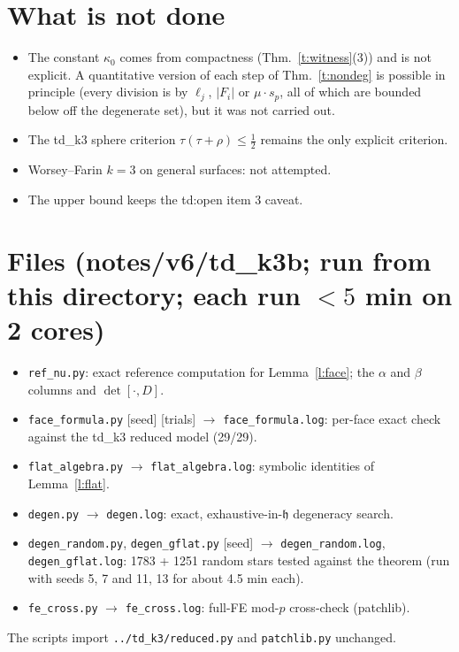 \documentclass[11pt]{article}
\theoremstyle{definition}
\newcommand{\hh}{\mathfrak h}
\begin{document}
\section{What is not done}
\begin{itemize}[leftmargin=1.2em]
\item The constant $\kappa_0$ comes from compactness (Thm.~\ref{t:witness}(3)) and is not explicit. A quantitative version of each step of Thm.~\ref{t:nondeg} is possible in principle (every division is by $\ell_j$, $|F_i|$ or $\mu\cdot s_p$, all of which are bounded below off the degenerate set), but it was not carried out.
\item The td\_k3 sphere criterion $\tau(\tau+\rho)\le\frac12$ remains the only explicit criterion.
\item Worsey--Farin $k=3$ on general surfaces: not attempted.
\item The upper bound keeps the td:open item 3 caveat.
\end{itemize}

\section*{Files (notes/v6/td\_k3b; run from this directory; each run $<5$ min on 2 cores)}
\begin{itemize}[leftmargin=1.2em]\small
\item \texttt{ref\_nu.py}: exact reference computation for Lemma~\ref{l:face}; the $\alpha$ and $\beta$ columns and $\det[\cdot,D]$.
\item \texttt{face\_formula.py} [seed] [trials] $\to$ \texttt{face\_formula.log}: per-face exact check against the td\_k3 reduced model (29/29).
\item \texttt{flat\_algebra.py} $\to$ \texttt{flat\_algebra.log}: symbolic identities of Lemma~\ref{l:flat}.
\item \texttt{degen.py} $\to$ \texttt{degen.log}: exact, exhaustive-in-$\hh$ degeneracy search.
\item \texttt{degen\_random.py}, \texttt{degen\_gflat.py} [seed] $\to$ \texttt{degen\_random.log}, \texttt{degen\_gflat.log}: 1783 + 1251 random stars tested against the theorem (run with seeds 5, 7 and 11, 13 for about 4.5 min each).
\item \texttt{fe\_cross.py} $\to$ \texttt{fe\_cross.log}: full-FE mod-$p$ cross-check (patchlib).
\end{itemize}
The scripts import \texttt{../td\_k3/reduced.py} and \texttt{patchlib.py} unchanged.
\end{document}
